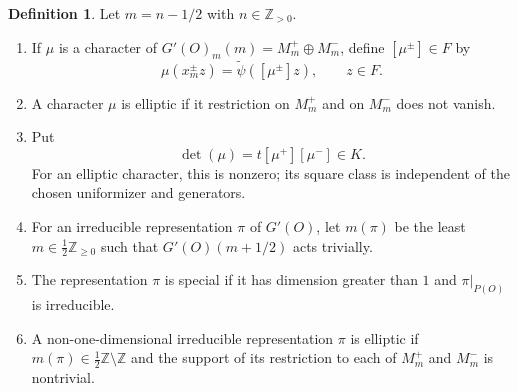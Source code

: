 \documentclass[11pt,a4paper,twoside]{amsart}
\theoremstyle{definition}
\newtheorem{definition}[theorem]{Definition}
\theoremstyle{remark}
\newcommand{\ZZ}{\mathbb Z}
\newcommand{\sm}{\setminus}
\begin{document}
\begin{definition}\label{ac}
Let $m=n-1/2$ with $n\in\ZZ_{>0}$.
\begin{enumerate}
\item If $\mu$ is a character of $G'(O)_m(m)=M_m^+\oplus M_m^-$, define $[\mu^\pm]\in F$ by
$$
\mu(x_m^\pm z)=\widetilde\psi([\mu^\pm]z),\qquad z\in F.
$$
\item A character $\mu$ is elliptic if it restriction on $M_m^+$ and on $M_m^-$ does not vanish.
\item Put
$$
\det(\mu)=t[\mu^+][\mu^-]\in K.
$$
For an elliptic character, this is nonzero; its square class is independent of the chosen uniformizer and generators.
\item For an irreducible representation $\pi$ of $G'(O)$, let $m(\pi)$ be the least $m\in\frac12\ZZ_{\geq0}$ such that $G'(O)(m+1/2)$ acts trivially.
\item The representation $\pi$ is special if it has dimension greater than $1$ and $\pi|_{P(O)}$ is irreducible.
\item A non-one-dimensional irreducible representation $\pi$ is elliptic if $m(\pi)\in\frac12\ZZ\sm\ZZ$ and the support of its restriction to each of $M_m^+$ and $M_m^-$ is nontrivial.
\end{enumerate}
\end{definition}
\end{document}
